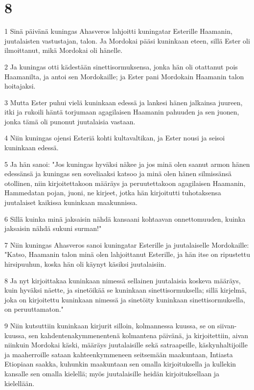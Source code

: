 \chapter{8}

\par 1 Sinä päivänä kuningas Ahasveros lahjoitti kuningatar Esterille Haamanin, juutalaisten vastustajan, talon. Ja Mordokai pääsi kuninkaan eteen, sillä Ester oli ilmoittanut, mikä Mordokai oli hänelle.
\par 2 Ja kuningas otti kädestään sinettisormuksensa, jonka hän oli otattanut pois Haamanilta, ja antoi sen Mordokaille; ja Ester pani Mordokain Haamanin talon hoitajaksi.
\par 3 Mutta Ester puhui vielä kuninkaan edessä ja lankesi hänen jalkainsa juureen, itki ja rukoili häntä torjumaan agagilaisen Haamanin pahuuden ja sen juonen, jonka tämä oli punonut juutalaisia vastaan.
\par 4 Niin kuningas ojensi Esteriä kohti kultavaltikan, ja Ester nousi ja seisoi kuninkaan edessä.
\par 5 Ja hän sanoi: "Jos kuningas hyväksi näkee ja jos minä olen saanut armon hänen edessänsä ja kuningas sen soveliaaksi katsoo ja minä olen hänen silmissänsä otollinen, niin kirjoitettakoon määräys ja peruutettakoon agagilaisen Haamanin, Hammedatan pojan, juoni, ne kirjeet, jotka hän kirjoitutti tuhotaksensa juutalaiset kaikissa kuninkaan maakunnissa.
\par 6 Sillä kuinka minä jaksaisin nähdä kansaani kohtaavan onnettomuuden, kuinka jaksaisin nähdä sukuni surman!"
\par 7 Niin kuningas Ahasveros sanoi kuningatar Esterille ja juutalaiselle Mordokaille: "Katso, Haamanin talon minä olen lahjoittanut Esterille, ja hän itse on ripustettu hirsipuuhun, koska hän oli käynyt käsiksi juutalaisiin.
\par 8 Ja nyt kirjoittakaa kuninkaan nimessä sellainen juutalaisia koskeva määräys, kuin hyväksi näette, ja sinetöikää se kuninkaan sinettisormuksella; sillä kirjelmä, joka on kirjoitettu kuninkaan nimessä ja sinetöity kuninkaan sinettisormuksella, on peruuttamaton."
\par 9 Niin kutsuttiin kuninkaan kirjurit silloin, kolmannessa kuussa, se on siivan-kuussa, sen kahdentenakymmenentenä kolmantena päivänä, ja kirjoitettiin, aivan niinkuin Mordokai käski, määräys juutalaisille sekä satraapeille, käskynhaltijoille ja maaherroille sataan kahteenkymmeneen seitsemään maakuntaan, Intiasta Etiopiaan saakka, kuhunkin maakuntaan sen omalla kirjoituksella ja kullekin kansalle sen omalla kielellä; myös juutalaisille heidän kirjoituksellaan ja kielellään.

